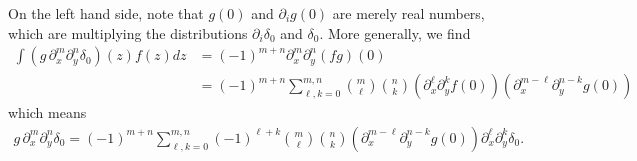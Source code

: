 \documentclass[12pt]{amsart}
\theoremstyle{remark}
\begin{document}
On the left hand side, note that $g(0)$ and $\partial_i g(0)$ are merely real numbers,
which are multiplying the distributions $\partial_i \delta_0$ and $\delta_0$.
More generally, we find
\begin{align*}
	\int (g\, \partial_x^m \partial_y^n \delta_0)(z) f(z) dz &= (-1)^{m+n} \partial_x^m \partial_y^n (fg)(0) \\
		&= (-1)^{m+n} \sum_{\ell,k=0}^{m,n} \binom{m}{\ell} \binom{n}{k}
		\left(\partial_{x}^{\ell} \partial_y^k f(0) \right) 
		\left(\partial_{x}^{m-\ell} \partial_y^{n-k} g(0) \right) 
\end{align*}
which means
\begin{align}
	g \, \partial_x^m \partial_y^n \delta_0 =
		(-1)^{m+n} \sum_{\ell,k=0}^{m,n} (-1)^{\ell + k}
		\binom{m}{\ell} \binom{n}{k}
		\left(\partial_{x}^{m-\ell} \partial_y^{n-k} g(0) \right) 
		\partial_{x}^{\ell} \partial_y^k \delta_0.
                \label{eq:func times partial delta}
\end{align}

\end{document}

